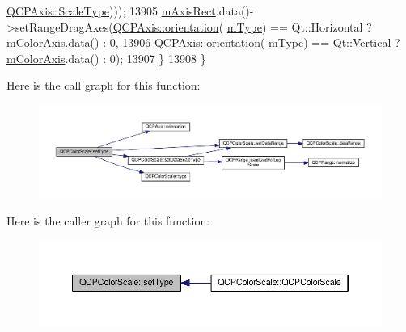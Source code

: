 \begin{DoxyCode}
      \hyperlink{class_q_c_p_axis_a36d8e8658dbaa179bf2aeb973db2d6f0}{QCPAxis::ScaleType})));
13905     \hyperlink{class_q_c_p_color_scale_a6e37f7d49cd614dc50ef1caae60461b9}{mAxisRect}.data()->setRangeDragAxes(\hyperlink{class_q_c_p_axis_a57483f2f60145ddc9e63f3af53959265}{QCPAxis::orientation}(
      \hyperlink{class_q_c_p_color_scale_a7d47ed4ab76f38e50164e9d77fe33789}{mType}) == Qt::Horizontal ? \hyperlink{class_q_c_p_color_scale_a2efbc90fd31898fe05d2b74a8422b1d5}{mColorAxis}.data() : 0,
13906                                        \hyperlink{class_q_c_p_axis_a57483f2f60145ddc9e63f3af53959265}{QCPAxis::orientation}(
      \hyperlink{class_q_c_p_color_scale_a7d47ed4ab76f38e50164e9d77fe33789}{mType}) == Qt::Vertical ? \hyperlink{class_q_c_p_color_scale_a2efbc90fd31898fe05d2b74a8422b1d5}{mColorAxis}.data() : 0);
13907   \}
13908 \}
\end{DoxyCode}


Here is the call graph for this function\+:\nopagebreak
\begin{figure}[H]
\begin{center}
\leavevmode
\includegraphics[width=350pt]{class_q_c_p_color_scale_a1bf9bdb291927c422dd66b404b206f1f_cgraph}
\end{center}
\end{figure}




Here is the caller graph for this function\+:\nopagebreak
\begin{figure}[H]
\begin{center}
\leavevmode
\includegraphics[width=350pt]{class_q_c_p_color_scale_a1bf9bdb291927c422dd66b404b206f1f_icgraph}
\end{center}
\end{figure}


\hypertarget{class_q_c_p_color_scale_a9a5236328c97fbfde01e3d91c4fcce6a}{}

